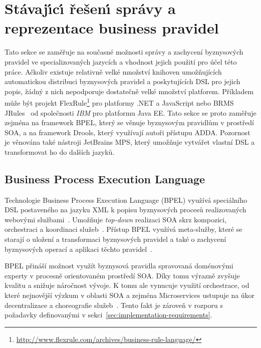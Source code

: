 \section{Stávaj\'{\i}c\'{\i} řešen\'{\i} správy a reprezentace business pravidel}\label{sec:business-rule-dsl}

Tato sekce se zaměřuje na současné možnosti správy a zachycení byznysových pravidel
ve specializovaných jazycích a vhodnost jejich použití pro účel této práce.
Ačkoliv existuje relativně velké množství knihoven umožňujících automatickou distribuci
byznysových pravidel a poskytujících \gls{DSL} pro jejich popis, žádný z nich nepodporuje dostatečně velké množství platforem.
Příkladem může být projekt FlexRule\footnote{\url{http://www.flexrule.com/archives/business-rule-language/}} pro platformy .NET a
JavaScript nebo \gls{BRMS} JRules~\cite{boyer2011ibm} od společnosti \textit{IBM} pro platformu \gls{Java EE}.
Tato sekce se proto zaměřuje zejména na framework \gls{BPEL}, který se věnuje byznysovým pravidlům v prostředí \gls{SOA}, a na
framework Drools, který využívají autoři přístupu \gls{ADDA}. Pozornost je věnována také nástroji JetBrains MPS,
který umožňuje vytvářet vlastní \gls{DSL} a transformovat ho do dalších jazyků.

\subsection{Business Process Execution Language}

Technologie Business Process Execution Language (\gls{BPEL}) využívá speciálního \gls{DSL}
postaveného na jazyku \gls{XML} k popisu byznysových procesů realizovaných webovými
službami~\cite{andrews2003business}. Umožňuje \textit{top-down} realizaci \gls{SOA}
skrz kompozici, orchestraci a koordinaci služeb~\cite{oraclebpel}.
Přístup \gls{BPEL} využívá meta-služby, které se starají o uložení a transformaci byznysových pravidel
a také o zachycení byznysových operací a aplikaci těchto pravidel~\cite{rosenberg2005business}.

\gls{BPEL} přináší možnost využít byznysová pravidla spravovaná doménovými experty
v procesně orientovaném prostředí \gls{SOA}. Díky tomu výrazně zvyšuje kvalitu a snižuje
náročnost vývoje. K tomu ale vynucuje využití orchestrace, od které nejnovější výzkum v oblasti \gls{SOA}
a zejména Microservices ustupuje na úkor decentralizace a choreografie
služeb~\cite{bakshi2017microservices}\cite{cerny2018contextual}. Tento fakt je zároveň
v rozporu s požadavky definovanými v sekci~\ref{sec:implementation-requirements}.

